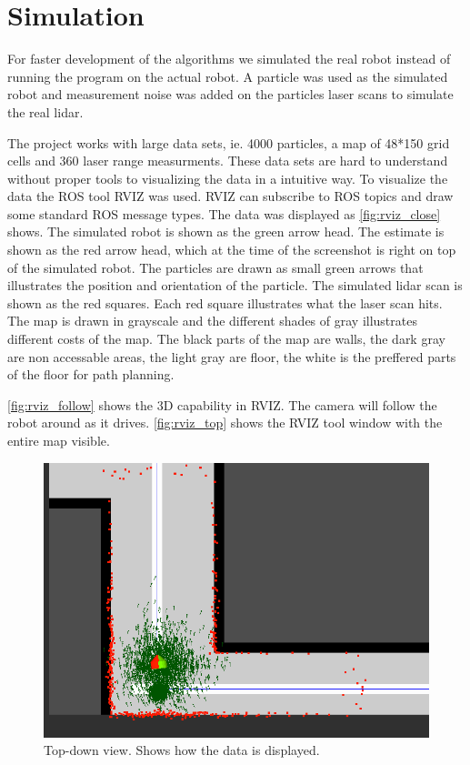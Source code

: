 
\section{Simulation} %
\label{sec:simulation}

For faster development of the algorithms we simulated the real robot instead of running the program on the actual robot.
A particle was used as the simulated robot and measurement noise was added on the particles laser scans to simulate the real lidar.

The project works with large data sets, ie. 4000 particles, a map of 48*150 grid cells and 360 laser range measurments.
These data sets are hard to understand without proper tools to visualizing the data in a intuitive way.
To visualize the data the ROS tool RVIZ was used.
RVIZ can subscribe to ROS topics and draw some standard ROS message types.
The data was displayed as \autoref{fig:rviz_close} shows.
The simulated robot is shown as the green arrow head.
The estimate is shown as the red arrow head, which at the time of the screenshot is right on top of the simulated robot.
The particles are drawn as small green arrows that illustrates the position and orientation of the particle.
The simulated lidar scan is shown as the red squares. Each red square illustrates what the laser scan hits.
The map is drawn in grayscale and the different shades of gray illustrates different costs of the map.
The black parts of the map are walls, the dark gray are non accessable areas, the light gray are floor, the white is the preffered parts of the floor for path planning.

\autoref{fig:rviz_follow} shows the 3D capability in RVIZ. The camera will follow the robot around as it drives. 
\autoref{fig:rviz_top} shows the RVIZ tool window with the entire map visible.

\begin{figure}[H]
\centering
\includegraphics[scale=0.50]{images/rviz_close}
\caption{Top-down view. Shows how the data is displayed.}
\label{fig:rviz_close}
\end{figure}

